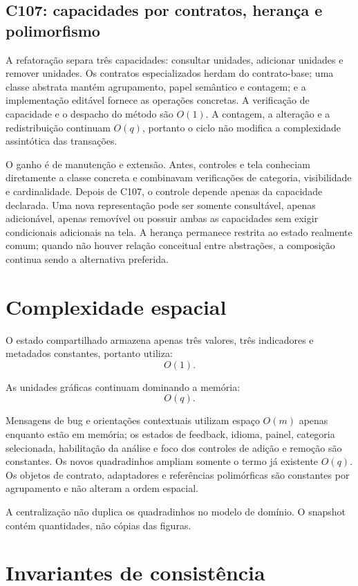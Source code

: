 \documentclass[12pt,a4paper]{article}
\begin{document}
\subsection{C107: capacidades por contratos, herança e polimorfismo}
A refatoração separa três capacidades: consultar unidades, adicionar unidades e remover unidades. Os contratos especializados herdam do contrato-base; uma classe abstrata mantém agrupamento, papel semântico e contagem; e a implementação editável fornece as operações concretas. A verificação de capacidade e o despacho do método são $O(1)$. A contagem, a alteração e a redistribuição continuam $O(q)$, portanto o ciclo não modifica a complexidade assintótica das transações.

O ganho é de manutenção e extensão. Antes, controles e tela conheciam diretamente a classe concreta e combinavam verificações de categoria, visibilidade e cardinalidade. Depois de C107, o controle depende apenas da capacidade declarada. Uma nova representação pode ser somente consultável, apenas adicionável, apenas removível ou possuir ambas as capacidades sem exigir condicionais adicionais na tela. A herança permanece restrita ao estado realmente comum; quando não houver relação conceitual entre abstrações, a composição continua sendo a alternativa preferida.

\section{Complexidade espacial}

O estado compartilhado armazena apenas três valores, três indicadores e metadados constantes, portanto utiliza:
\[
O(1).
\]

As unidades gráficas continuam dominando a memória:
\[
O(q).
\]

Mensagens de bug e orientações contextuais utilizam espaço $O(m)$ apenas enquanto estão em memória; os estados de feedback, idioma, painel, categoria selecionada, habilitação da análise e foco dos controles de adição e remoção são constantes. Os novos quadradinhos ampliam somente o termo já existente $O(q)$. Os objetos de contrato, adaptadores e referências polimórficas são constantes por agrupamento e não alteram a ordem espacial.

A centralização não duplica os quadradinhos no modelo de domínio. O snapshot contém quantidades, não cópias das figuras.

\section{Invariantes de consistência}
\end{document}
